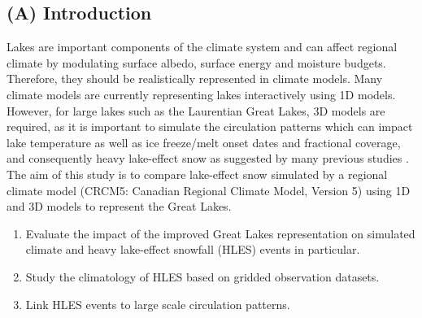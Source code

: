 \documentclass[a0b,landscape]{a0poster}
\begin{document}
\begin{multicols*}{4} %



\section*{(A) Introduction}
Lakes are important components of the climate system and can affect regional
climate by modulating surface albedo, surface energy and moisture budgets.
Therefore, they should be realistically represented in climate models. Many
climate models are currently representing lakes interactively using 1D models.
However, for large lakes such as the Laurentian Great Lakes, 3D models are
required, as it is important to simulate the circulation patterns which can
impact lake temperature as well as ice freeze/melt onset dates and fractional
coverage, and consequently heavy lake-effect snow as suggested by many previous studies \citep{wright2013,vavrus2013}. The aim
of this study is to compare lake-effect snow simulated by a regional climate
model (CRCM5: Canadian Regional Climate Model, Version 5) \citep{huziy2017} using 1D and 3D models
to represent the Great Lakes.



\begin{tcolorbox}[colback=white,colframe=green!40!black,adjusted title={Main objectives}]
  \begin{enumerate}
  \item Evaluate the impact of the improved Great Lakes representation on simulated climate and heavy lake-effect snowfall (HLES) events in particular.
  \item Study the climatology of HLES based on gridded observation datasets.
  \item Link HLES events to large scale circulation patterns.
  \end{enumerate}
\end{tcolorbox}


\end{multicols*}
\end{document}
